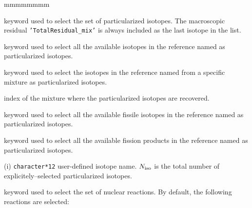 \begin{ListeDeDescription}{mmmmmmmm}
\item[\moc{ISOT}] keyword used to select the set of particularized isotopes. The macroscopic
residual {\tt 'TotalResidual\_mix'} is always included as the last isotope in the list.

\item[\moc{TOUT}] keyword used to select all the available isotopes in the reference
 named  as particularized isotopes.

\item[\moc{MILI}] keyword used to select the isotopes in the reference
 named  from a specific mixture as particularized isotopes.

\item[\dusa{imil}] index of the mixture where the particularized isotopes are recovered.

\item[\moc{FISS}] keyword used to select all the available fissile isotopes in the reference
 named  as particularized isotopes.

\item[\moc{PF}] keyword used to select all the available fission products in the reference
 named  as particularized isotopes.

\item[\dusa{HNAISO}(i)] {\tt character*12} user-defined isotope name. $N_{\rm iso}$ is the
total number of explicitely--selected particularized isotopes.

\item[\moc{REAC}] keyword used to select the set of nuclear reactions. By default, the following reactions are selected:


\end{ListeDeDescription}
